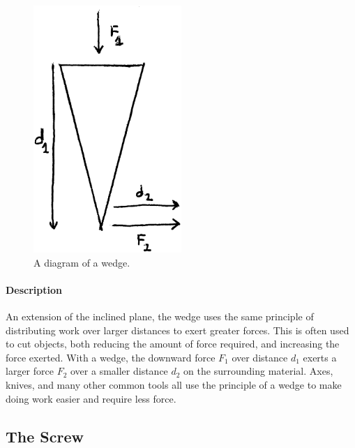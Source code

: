 \documentclass[12pt]{article}
\begin{document}
	\begin{figure}[H]
		\centerline{\includegraphics[width=0.5\textwidth]{images/wedge.EPS}}
		\caption{A diagram of a wedge.}
	\end{figure}

	\paragraph{Description}
	An extension of the inclined plane, the wedge uses the same principle of distributing work over larger distances to exert greater forces. This is often used to cut objects, both reducing the amount of force required, and increasing the force exerted. With a wedge, the downward force $F_1$ over distance $d_1$ exerts a larger force $F_2$ over a smaller distance $d_2$ on the surrounding material. Axes, knives, and many other common tools all use the principle of a wedge to make doing work easier and require less force.

	\subsection{The Screw}
	
\end{document}
